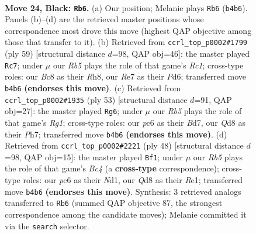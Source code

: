 \documentclass[11pt]{article}
\begin{document}
\clearpage

\begin{figure}[p]\centering
\begin{subfigure}{0.46\textwidth}\centering
\resizebox{\linewidth}{!}{%
\newchessgame
\chessboard[
  setfen={2bq1k2/Q1p1rp1p/P1P2n2/3p2N1/1r3P2/8/2P3P1/R1B2RK1 b - - 0 24},
  showmover=false,
  pgfstyle=straightmove, color=movearrow, markmove={b4-b6}
]}
\caption{}
\end{subfigure}\hfill
\begin{subfigure}{0.46\textwidth}\centering
\resizebox{\linewidth}{!}{%
\newchessgame
\chessboard[
  setfen={2r4r/1p2qpk1/3p2b1/N2Pp3/P1P5/6QP/1P3R1K/5R2 b - - 4 30},
  showmover=false,
  pgfstyle=straightmove, color=movearrow, markmove={c8-c7}
]}
\caption{}
\end{subfigure}
\\[4pt]
\begin{subfigure}{0.46\textwidth}\centering
\resizebox{\linewidth}{!}{%
\newchessgame
\chessboard[
  setfen={1kr3r1/1p1b1p1p/pq1p4/4n3/3N4/PB2R2P/1PP2Q2/1K1R4 b - - 0 27},
  showmover=false,
  pgfstyle=straightmove, color=movearrow, markmove={g8-g6}
]}
\caption{}
\end{subfigure}\hfill
\begin{subfigure}{0.46\textwidth}\centering
\resizebox{\linewidth}{!}{%
\newchessgame
\chessboard[
  setfen={1rbr2k1/4ppb1/5p2/3p4/qPB3P1/1R5p/2PQ1P1P/3NR1K1 w - - 0 25},
  showmover=false,
  pgfstyle=straightmove, color=movearrow, markmove={c4-f1}
]}
\caption{}
\end{subfigure}
\caption{\textbf{Move 24, Black: \texttt{Rb6}.} (a) Our position; Melanie plays \texttt{Rb6} (\texttt{b4b6}). Panels (b)--(d) are the retrieved master positions whose correspondence most drove this move (highest QAP objective among those that transfer to it). (b) Retrieved from \texttt{ccrl\_top\_p0002\#1799} (ply 59) [structural distance $d$=98, QAP obj=46]: the master played \texttt{Rc7}; under $\mu$ our \emph{Rb5} plays the role of that game's \emph{Rc1}; cross-type roles: our \emph{B}c8 as their \emph{R}h8, our \emph{R}e7 as their \emph{P}d6; transferred move \texttt{b4b6} \textbf{(endorses this move)}. (c) Retrieved from \texttt{ccrl\_top\_p0002\#1935} (ply 53) [structural distance $d$=91, QAP obj=27]: the master played \texttt{Rg6}; under $\mu$ our \emph{Rb5} plays the role of that game's \emph{Rg1}; cross-type roles: our \emph{p}c6 as their \emph{B}d7, our \emph{Q}d8 as their \emph{P}h7; transferred move \texttt{b4b6} \textbf{(endorses this move)}. (d) Retrieved from \texttt{ccrl\_top\_p0002\#2221} (ply 48) [structural distance $d$=98, QAP obj=15]: the master played \texttt{Bf1}; under $\mu$ our \emph{Rb5} plays the role of that game's \emph{Bc4} (a \textbf{cross-type} correspondence); cross-type roles: our \emph{p}c6 as their \emph{N}d1, our \emph{Q}d8 as their \emph{R}e1; transferred move \texttt{b4b6} \textbf{(endorses this move)}. Synthesis: 3 retrieved analogs transferred to \texttt{Rb6} (summed QAP objective 87, the strongest correspondence among the candidate moves); Melanie committed it via the \texttt{search} selector.}
\label{fig:thought-m47}
\end{figure}
\end{document}
